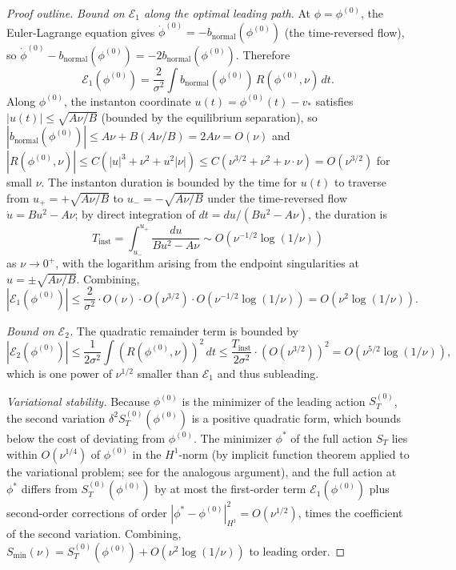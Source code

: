 \documentclass[11pt,a4paper]{article}
\theoremstyle{plain}
\theoremstyle{definition}
\begin{document}
\begin{proof}[Proof outline]
\emph{Bound on $\mathcal E_1$ along the optimal leading path.} At $\phi = \phi^{(0)}$, the Euler-Lagrange equation gives $\dot\phi^{(0)} = -b_{\text{normal}}(\phi^{(0)})$ (the time-reversed flow), so $\dot\phi^{(0)} - b_{\text{normal}}(\phi^{(0)}) = -2 b_{\text{normal}}(\phi^{(0)})$. Therefore
$$\mathcal E_1(\phi^{(0)}) = \frac{2}{\sigma^2}\int b_{\text{normal}}(\phi^{(0)})\,R(\phi^{(0)}, \nu)\,dt.$$
Along $\phi^{(0)}$, the instanton coordinate $u(t) = \phi^{(0)}(t) - v_*$ satisfies $|u(t)| \leq \sqrt{A\nu/B}$ (bounded by the equilibrium separation), so $|b_{\text{normal}}(\phi^{(0)})| \leq A\nu + B(A\nu/B) = 2A\nu = O(\nu)$ and $|R(\phi^{(0)}, \nu)| \leq C(|u|^3 + \nu^2 + u^2|\nu|) \leq C(\nu^{3/2} + \nu^2 + \nu\cdot\nu) = O(\nu^{3/2})$ for small $\nu$. The instanton duration is bounded by the time for $u(t)$ to traverse from $u_+ = +\sqrt{A\nu/B}$ to $u_- = -\sqrt{A\nu/B}$ under the time-reversed flow $\dot u = Bu^2 - A\nu$; by direct integration of $dt = du/(Bu^2 - A\nu)$, the duration is
$$T_{\text{inst}} = \int_{u_-}^{u_+}\frac{du}{Bu^2 - A\nu}\sim O(\nu^{-1/2}\log(1/\nu))$$
as $\nu \to 0^+$, with the logarithm arising from the endpoint singularities at $u = \pm\sqrt{A\nu/B}$. Combining,
$$|\mathcal E_1(\phi^{(0)})| \leq \frac{2}{\sigma^2}\cdot O(\nu)\cdot O(\nu^{3/2})\cdot O(\nu^{-1/2}\log(1/\nu)) = O(\nu^2\log(1/\nu)).$$

\emph{Bound on $\mathcal E_2$.} The quadratic remainder term is bounded by
$$|\mathcal E_2(\phi^{(0)})| \leq \frac{1}{2\sigma^2}\int (R(\phi^{(0)},\nu))^2\,dt \leq \frac{T_{\text{inst}}}{2\sigma^2}\cdot(O(\nu^{3/2}))^2 = O(\nu^{5/2}\log(1/\nu)),$$
which is one power of $\nu^{1/2}$ smaller than $\mathcal E_1$ and thus subleading.

\emph{Variational stability.} Because $\phi^{(0)}$ is the minimizer of the leading action $S_T^{(0)}$, the second variation $\delta^2 S_T^{(0)}(\phi^{(0)})$ is a positive quadratic form, which bounds below the cost of deviating from $\phi^{(0)}$. The minimizer $\phi^*$ of the full action $S_T$ lies within $O(\nu^{1/4})$ of $\phi^{(0)}$ in the $H^1$-norm (by implicit function theorem applied to the variational problem; see \cite[\S 5]{Berglund2013} for the analogous argument), and the full action at $\phi^*$ differs from $S_T^{(0)}(\phi^{(0)})$ by at most the first-order term $\mathcal E_1(\phi^{(0)})$ plus second-order corrections of order $|\phi^* - \phi^{(0)}|^2_{H^1} = O(\nu^{1/2})$, times the coefficient of the second variation. Combining, $S_{\min}(\nu) = S_T^{(0)}(\phi^{(0)}) + O(\nu^2\log(1/\nu))$ to leading order.


\end{proof}
\end{document}
